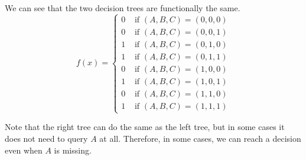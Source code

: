   \begin{example}
    \label{ex:robust-decision-tree-without-always-querying}
    We can see that the two decision trees are functionally the same. 
    \begin{equation}
      f(x) = \begin{cases} 
        0 & \text{ if } (A, B, C) = (0, 0, 0) \\
        0 & \text{ if } (A, B, C) = (0, 0, 1) \\
        1 & \text{ if } (A, B, C) = (0, 1, 0) \\
        1 & \text{ if } (A, B, C) = (0, 1, 1) \\
        0 & \text{ if } (A, B, C) = (1, 0, 0) \\
        1 & \text{ if } (A, B, C) = (1, 0, 1) \\
        0 & \text{ if } (A, B, C) = (1, 1, 0) \\
        1 & \text{ if } (A, B, C) = (1, 1, 1)
      \end{cases}
    \end{equation}

    Note that the right tree can do the same as the left tree, but in some cases it does not need to query $A$ at all. Therefore, in some cases, we can reach a decision even when $A$ is missing.


\end{example}
